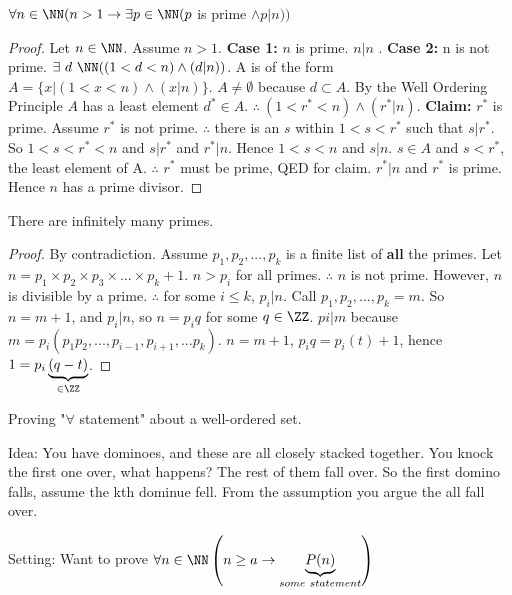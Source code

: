 
\begin{theorem}
$\forall n \in \NN ( n > 1 \to \exists p \in \NN ( p$ is prime $\wedge p|n)) $
\end{theorem}
\begin{proof}
Let $n\in\NN$. Assume $n>1$. \textbf{Case 1:} $n$ is prime. $n|n$ \checkmark. \textbf{Case 2:} n is not prime. $\exists\ d\ \NN ((1<d<n) \wedge (d|n))$. A is of the form $A = \{ x | (1 < x < n) \wedge (x|n) \}$. $A \neq \emptyset$ because $d \subset A$. By the Well Ordering Principle $A$ has a least element $d^*\in A$. $\therefore\ (1 < r^* < n) \wedge (r^*|n)$. \textbf{Claim:} $r^*$ is prime. Assume $r^*$ is not prime. $\therefore$ there is an $s$ within $1<s<r^*$ such that $s|r^*$. So $1<s<r^*<n$ and $s|r^*$ and $r^*|n$. Hence $1<s<n$ and $s|n$. $s\in A$ and $s<r^*$, the least element of A. $\therefore$ $r^*$ must be prime, QED for claim. $r^*|n$ and $r^*$ is prime. Hence $n$ has a prime divisor.
\end{proof}

\begin{theorem}There are infinitely many primes.\end{theorem}
\begin{proof}
By contradiction. Assume $p_1,p_2,...,p_k$ is a finite list of \textbf{all} the primes. Let $n=p_1\times p_2 \times p_3 \times ... \times p_k + 1$. $n>p_i$ for all primes. $\therefore$ $n$ is not prime. However, $n$ is divisible by a prime. $\therefore$ for some $i \le k$, $p_i|n$. Call $p_1,p_2,...,p_k = m$. So $n = m + 1$, and $p_i|n$, so $n=p_iq$ for some $q\in \ZZ$. $pi|m$ because $m = p_i(p_1p_2,...,p_{i-1},p_{i+1},...p_k)$. $n = m + 1$, $p_iq = p_i(t) + 1$, hence $ 1 = p_i \underbrace{\left(q-t\right)}_{\in \ZZ} $. %
\end{proof}


Proving "$\forall$ statement" about a well-ordered set.

Idea: You have dominoes, and these are all closely stacked together. You knock the first one over, what happens? The rest of them fall over. So the first domino falls, assume the kth dominue fell. From the assumption you argue the all fall over.

Setting: Want to prove $\forall n \in \NN \left( n \ge a \to \underbrace{P(n)}_{some\ statement} \right)$

